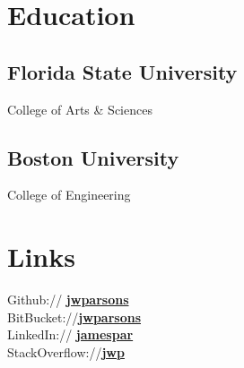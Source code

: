 \documentclass[]{deedy_resume}
\begin{document}
%
%
\lastupdated

%
%

%
%

\begin{minipage}[t]{0.33\textwidth} 


\section{Education} 
\subsection{Florida State University}
College of Arts \& Sciences\\
\sectionsep

\subsection{Boston University}
College of Engineering \\
\sectionsep


\section{Links} 
Github:// \href{https://github.com/jwparsons}{\bf jwparsons} \\
BitBucket://\href{https://bitbucket.org/jwparsons/}{\bf jwparsons} \\
LinkedIn://  \href{https://www.linkedin.com/in/jamespar/}{\bf jamespar} \\
StackOverflow://\href{https://stackoverflow.com/users/9915449/jwp}{\bf jwp}
\sectionsep


\end{minipage}
\end{document}

